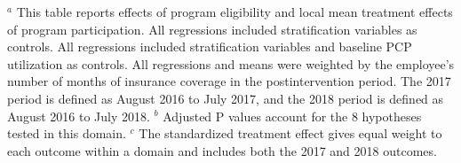\documentclass{article}
\begin{document}
\begin{landscape}
\begin{table}[tbp]
{\begin{tabularx}{\linewidth}{lCClCClCC}
\end{tabularx}
\begin{flushleft}
\tiny $^{a}$ This table reports effects of program eligibility and local mean treatment effects of program participation. All regressions included stratification variables as controls. All regressions included stratification variables and baseline PCP utilization as controls. All regressions and means were weighted by the employee's number of months of insurance coverage in the postintervention period. The 2017 period is defined as August 2016 to July 2017, and the 2018 period is defined as August 2016 to July 2018. \newline $^{b}$ Adjusted P values account for the 8 hypotheses tested in this domain. \newline $^{c}$ The standardized treatment effect gives equal weight to each outcome within a domain and includes both the 2017 and 2018 outcomes.
\end{flushleft}
}
\end{table}
\end{landscape}
\end{document}
